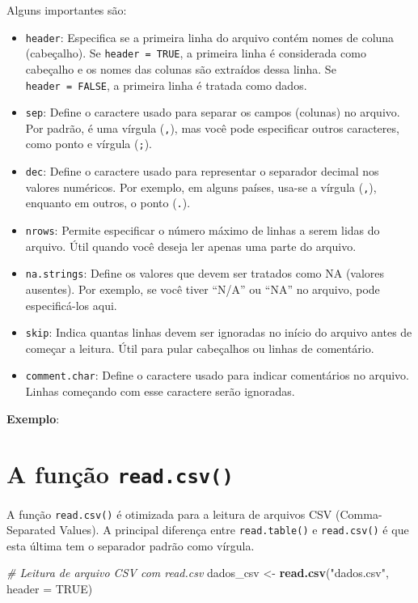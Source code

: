 \documentclass[
]{book}
\newenvironment{Shaded}{\begin{snugshade}}{\end{snugshade}}
\newcommand{\AttributeTok}[1]{\textcolor[rgb]{0.13,0.29,0.53}{#1}}
\newcommand{\CommentTok}[1]{\textcolor[rgb]{0.56,0.35,0.01}{\textit{#1}}}
\newcommand{\ConstantTok}[1]{\textcolor[rgb]{0.56,0.35,0.01}{#1}}
\newcommand{\FunctionTok}[1]{\textcolor[rgb]{0.13,0.29,0.53}{\textbf{#1}}}
\newcommand{\NormalTok}[1]{#1}
\newcommand{\OtherTok}[1]{\textcolor[rgb]{0.56,0.35,0.01}{#1}}
\newcommand{\StringTok}[1]{\textcolor[rgb]{0.31,0.60,0.02}{#1}}
\providecommand{\tightlist}{%
  \setlength{\itemsep}{0pt}\setlength{\parskip}{0pt}}
\begin{document}
Alguns importantes são:

\begin{itemize}
\tightlist
\item
  \texttt{header}: Especifica se a primeira linha do arquivo contém nomes de coluna (cabeçalho). Se \texttt{header\ =\ TRUE}, a primeira linha é considerada como cabeçalho e os nomes das colunas são extraídos dessa linha. Se \texttt{header\ =\ FALSE}, a primeira linha é tratada como dados.
\item
  \texttt{sep}: Define o caractere usado para separar os campos (colunas) no arquivo. Por padrão, é uma vírgula (\texttt{,}), mas você pode especificar outros caracteres, como ponto e vírgula (\texttt{;}).
\item
  \texttt{dec}: Define o caractere usado para representar o separador decimal nos valores numéricos. Por exemplo, em alguns países, usa-se a vírgula (\texttt{,}), enquanto em outros, o ponto (\texttt{.}).
\item
  \texttt{nrows}: Permite especificar o número máximo de linhas a serem lidas do arquivo. Útil quando você deseja ler apenas uma parte do arquivo.
\item
  \texttt{na.strings}: Define os valores que devem ser tratados como NA (valores ausentes). Por exemplo, se você tiver ``N/A'' ou ``NA'' no arquivo, pode especificá-los aqui.
\item
  \texttt{skip}: Indica quantas linhas devem ser ignoradas no início do arquivo antes de começar a leitura. Útil para pular cabeçalhos ou linhas de comentário.
\item
  \texttt{comment.char}: Define o caractere usado para indicar comentários no arquivo. Linhas começando com esse caractere serão ignoradas.
\end{itemize}

\textbf{Exemplo}:

\section{\texorpdfstring{A função \texttt{read.csv()}}{A função read.csv()}}\label{a-funuxe7uxe3o-read.csv}

A função \texttt{read.csv()} é otimizada para a leitura de arquivos CSV (Comma-Separated Values). A principal diferença entre \texttt{read.table()} e \texttt{read.csv()} é que esta última tem o separador padrão como vírgula.

\begin{Shaded}
\begin{Highlighting}[]
\CommentTok{\# Leitura de arquivo CSV com read.csv}
\NormalTok{dados\_csv }\OtherTok{\textless{}{-}} \FunctionTok{read.csv}\NormalTok{(}\StringTok{"dados.csv"}\NormalTok{, }\AttributeTok{header =} \ConstantTok{TRUE}\NormalTok{)}
\end{Highlighting}
\end{Shaded}
\end{document}
